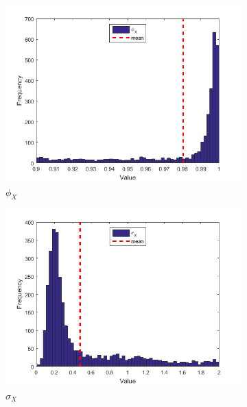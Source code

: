 \documentclass[11pt,a4,twosided,singlespacing,titlepagenumber=on]{scrreprt}
\numberwithin{equation}{chapter} %
\theoremstyle{remark}
\begin{document}
\begin{figure}[H]
    \centering
    \begin{subfigure}[t]{0.32\textwidth}
        \centering
        \includegraphics[width=1\textwidth]{res/params/2923_3653/1}
        \caption{$\phi_X$}
    \end{subfigure}
    \begin{subfigure}[t]{0.32\textwidth}
        \centering
        \includegraphics[width=1\textwidth]{res/params/2923_3653/2}
        \caption{$\sigma_X$}
    \end{subfigure}
    \begin{subfigure}[t]{0.32\textwidth}
        \centering

\end{subfigure}
\end{figure}
\end{document}
